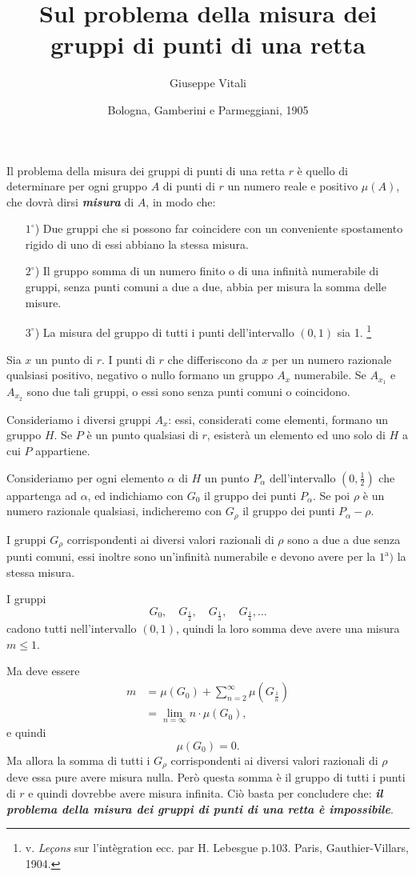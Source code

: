 \documentclass{article}
\title{Sul problema della misura dei gruppi di punti di una retta}
\author{Giuseppe Vitali}
\date{\small Bologna, Gamberini e Parmeggiani, 1905}
\begin{document}
\maketitle

Il problema della misura dei gruppi di punti di una retta $r$ è quello di determinare per ogni gruppo $A$ di punti di $r$ un numero reale e positivo $\mu(A)$, che dovrà dirsi \emph{\bfseries misura} di $A$, in modo che:

\begin{itemize}
	\item[$1^\circ$)] Due gruppi che si possono far coincidere con un conveniente spostamento rigido di uno di essi abbiano la stessa misura.
	\item[$2^\circ$)] Il gruppo somma di un numero finito o di una infinità numerabile di gruppi, senza punti comuni a due a due, abbia per misura la somma delle misure.
	\item[$3^\circ$)] La misura del gruppo di tutti i punti dell'intervallo $(0,1)$ sia 1. \footnote{ v. {\em Le\c cons} sur l'int\`egration ecc. par H. Lebesgue p.103. Paris, Gauthier-Villars, 1904.}
\end{itemize}

Sia $x$ un punto di $r$. I punti di $r$ che differiscono da $x$ per un numero razionale qualsiasi positivo, negativo o nullo formano un gruppo $A_x$ numerabile. Se $A_{x_1}$ e $A_{x_2}$ sono due tali gruppi, o essi sono senza punti comuni o coincidono.

Consideriamo i diversi gruppi $A_x$: essi, considerati come elementi, formano un gruppo $H$. Se $P$ è un punto qualsiasi di $r$, esisterà un elemento ed uno solo di $H$ a cui $P$ appartiene.

Consideriamo per ogni elemento $\alpha$ di $H$ un punto $P_\alpha$ dell'intervallo $(0,\frac12)$ che appartenga ad $\alpha$, ed indichiamo con $G_0$ il gruppo dei punti $P_\alpha$. Se poi $\rho$ è un numero razionale qualsiasi, indicheremo con $G_\rho$ il gruppo dei punti $P_\alpha-\rho$.

I gruppi $G_\rho$ corrispondenti ai diversi valori razionali di $\rho$ sono a due a due senza punti comuni, essi inoltre sono un'infinità numerabile e devono avere per la $1^\textrm{a})$ la stessa misura.

I gruppi
\[
	G_0, \quad G_{\frac12}, \quad G_{\frac13}, \quad G_{\frac14}, \dots
\]
cadono tutti nell'intervallo $(0,1)$, quindi la loro somma deve avere una misura $m\leq1$.

Ma deve essere
\begin{align*}
	m &= \mu(G_0) + \sum_{n=2}^\infty \mu\left(G_{\frac1n}\right) \\
		&= \lim_{n=\infty} n\cdot\mu(G_0),
\end{align*}
e quindi
\[
	\mu(G_0)=0.
\]
Ma allora la somma di tutti i $G_\rho$ corrispondenti ai diversi valori razionali di $\rho$ deve essa pure avere misura nulla. Però questa somma è il gruppo di tutti i punti di $r$ e quindi dovrebbe avere misura infinita. Ciò basta per concludere che: \emph{\bfseries il problema della misura dei gruppi di punti di una retta è impossibile}.
\end{document}
